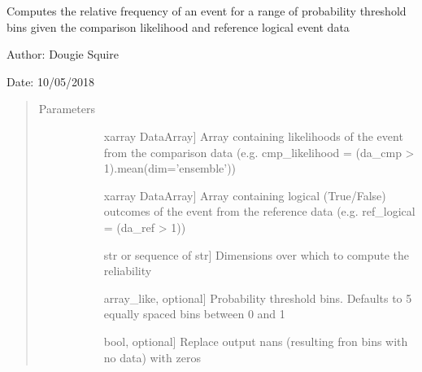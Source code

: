 \documentclass[letterpaper,10pt,english]{sphinxmanual}
\begin{document}

\begin{fulllineitems}
\label{\detokenize{skill_doc:skill.reliability}}
Computes the relative frequency of an event for a range of probability threshold bins                 given the comparison likelihood and reference logical event data

\begin{DUlineblock}{0em}
\item[] Author: Dougie Squire
\item[] Date: 10/05/2018
\end{DUlineblock}
\begin{quote}\begin{description}
\item[{Parameters}] \leavevmode\begin{description}
\item[{}] \leavevmode{[}xarray DataArray{]}
Array containing likelihoods of the event from the comparison data (e.g. cmp\_likelihood =                     (da\_cmp \textgreater{} 1).mean(dim=’ensemble’))

\item[{}] \leavevmode{[}xarray DataArray{]}
Array containing logical (True/False) outcomes of the event from the reference data (e.g.                    ref\_logical = (da\_ref \textgreater{} 1))

\item[{}] \leavevmode{[}str or sequence of str{]}
Dimensions over which to compute the reliability

\item[{}] \leavevmode{[}array\_like, optional{]}
Probability threshold bins. Defaults to 5 equally spaced bins between 0 and 1

\item[{}] \leavevmode{[}bool, optional{]}
Replace output nans (resulting fron bins with no data) with zeros

\end{description}


\end{description}
\end{quote}
\end{fulllineitems}
\end{document}
